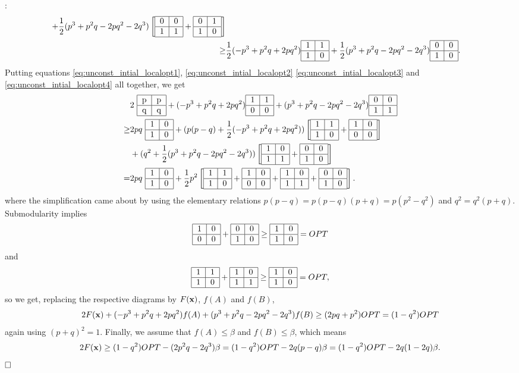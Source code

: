 \documentclass{article}[11pt]
\renewenvironment{proof}{\noindent{\bf Proof}:~}{$\hfill \Box$\\}
\newcommand{\T}[4] {\begin{tabular}{|c|c|}
\hline
#1 & #2 \\
\hline
#3 & #4 \\
\hline
\end{tabular}}
\def\bx{{\bf x}}
\begin{document}
\begin{proof}
\begin{eqnarray}
  + \frac12 (p^3 + p^2 q -2pq^2 -2q^3) \left[ \T{0}{0}{1}{1} + \T{0}{1}{1}{0} \right] \nonumber \\
  \label{eq:unconst_intial_localopt4}
 \geq & \frac12 (-p^3 + p^2 q + 2pq^2) \T{1}{1}{1}{0} +
  \frac12 (p^3 + p^2 q -2pq^2 -2q^3) \T{0}{0}{1}{0}.
\end{eqnarray}
Putting equations \eqref{eq:unconst_intial_localopt1}, \eqref{eq:unconst_intial_localopt2} \eqref{eq:unconst_intial_localopt3} and \eqref{eq:unconst_intial_localopt4} all together, we get
\begin{eqnarray*}
& 2~\T{p}{p}{q}{q} + (-p^3 + p^2 q + 2pq^2) \T{1}{1}{0}{0}
 + (p^3 + p^2 q -2pq^2 -2q^3) \T{0}{0}{1}{1} \\
\geq & 2pq~\T{1}{0}{1}{0} + (p(p-q) + \frac12 (-p^3 + p^2 q + 2pq^2))
 \left[ \T{1}{1}{1}{0} + \T{1}{0}{0}{0} \right] \\
 & + (q^2 + \frac12 (p^3 + p^2 q - 2pq^2 - 2q^3)) 
 \left[ \T{1}{0}{1}{1} + \T{0}{0}{1}{0} \right]\\
 = & 2pq~\T{1}{0}{1}{0} + \frac12 p^2 \left[ \T{1}{1}{1}{0} + \T{1}{0}{0}{0}
  + \T{1}{0}{1}{1} + \T{0}{0}{1}{0} \right].
 \end{eqnarray*}
where the simplification came about by using the elementary relations
 $p(p-q) = p(p-q)(p+q) = p(p^2-q^2)$ and $q^2 = q^2 (p+q)$.
Submodularity implies 
$$ \T{1}{0}{0}{0} + \T{0}{0}{1}{0} \geq \T{1}{0}{1}{0} = OPT $$
and 
$$ \T{1}{1}{1}{0} + \T{1}{0}{1}{1} \geq \T{1}{0}{1}{0} = OPT, $$
so we get, replacing the respective diagrams by $F(\bx)$, $f(A)$ and $f(B)$,
$$ 2 F(\bx) + (-p^3 + p^2 q + 2pq^2) f(A) + (p^3 + p^2 q -2pq^2 -2q^3) f(B)
 \geq (2pq + p^2) OPT = (1-q^2) OPT $$
again using $(p+q)^2 = 1$.
Finally, we assume that $f(A) \leq \beta$ and $f(B) \leq \beta$, which means
$$ 2 F(\bx) \geq (1-q^2) OPT - (2p^2 q - 2q^3) \beta = (1-q^2) OPT - 2q (p-q) \beta
 = (1-q^2) OPT - 2q (1-2q) \beta.$$
\end{proof}
\end{document}
